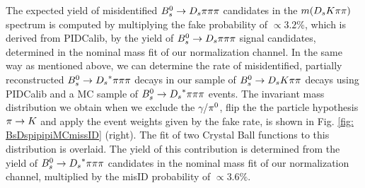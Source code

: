 The expected yield of misidentified ${{B}^0_{s}}\rightarrow{\ensuremath{{D}_{s}}}{\ensuremath{\pi}}{\ensuremath{\pi}}{\ensuremath{\pi}}$ candidates in the $m({{D}_{s}}{K}{\pi}{\pi})$ spectrum is computed by multiplying the fake probability of $\propto3.2\%$, which is derived from PIDCalib, by the yield of ${{B}^0_{s}}\rightarrow{\ensuremath{{D}_{s}}}{\ensuremath{\pi}}{\ensuremath{\pi}}{\ensuremath{\pi}}$ signal candidates, determined in the nominal mass fit of our normalization channel.  \newline
In the same way as mentioned above, we can determine the rate of misidentified, partially reconstructed ${{B}^0_{s}}\rightarrow{\ensuremath{{D}_{s}}}^{*}{\pi}{\pi}{\pi}$ decays in our sample of ${{B}^0_{s}}\rightarrow{\ensuremath{{D}_{s}}}{\ensuremath{K}}{\ensuremath{\pi}}{\ensuremath{\pi}}$ decays using PIDCalib and a MC sample of ${{B}^0_{s}}\rightarrow{\ensuremath{{D}_{s}}}^{*}{\pi}{\pi}{\pi}$ events. The invariant mass distribution we obtain when we exclude the $\gamma$/${{\pi}^0}$, flip the the particle hypothesis ${\pi}\rightarrow{\ensuremath{K}}$ and apply the event weights given by the fake rate, is shown in Fig. \ref{fig: BsDspipipiMCmissID} (right). The fit of two Crystal Ball functions to this distribution is overlaid. 
The yield of this contribution is determined from the yield of ${{B}^0_{s}}\rightarrow{\ensuremath{{D}_{s}}}^{*}{\pi}{\pi}{\pi}$ candidates in the nominal mass fit of our normalization channel, multiplied by the misID probability of $\propto 3.6\%$.


